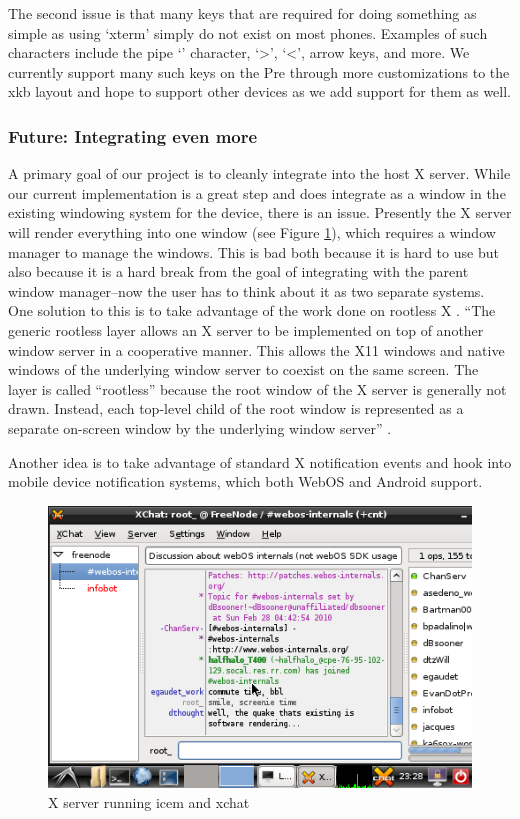 The second issue is that many keys that are required for doing something as simple as using `xterm' simply do not exist on most phones.  Examples of such characters include the pipe `\textbar' character, `\textgreater', `\textless', arrow keys, and more.  We currently support many such keys on the Pre through more customizations to the xkb layout and hope to support other devices as we add support for them as well. \\

\subsubsection{Future: Integrating even more}
A primary goal of our project is to cleanly integrate into the host X server.  While our current implementation is a great step and does integrate as a window in the existing windowing system for the device, there is an issue.  Presently the X server will render everything into one window (see Figure \ref{fig:x_screenie}), which requires a window manager to manage the windows.  This is bad both because it is hard to use but also because it is a hard break from the goal of integrating with the parent window manager--now the user has to think about it as two separate systems.\\

One solution to this is to take advantage of the work done on rootless X \cite{rootless}.  ``The generic rootless layer allows an X server to be implemented on top of another window server in a cooperative manner. This allows the X11 windows and native windows of the underlying window server to coexist on the same screen. The layer is called ``rootless'' because the root window of the X server is generally not drawn. Instead, each top-level child of the root window is represented as a separate on-screen window by the underlying window server'' \cite{rootless}.\\


Another idea is to take advantage of standard X notification events \cite{notifications} and hook into mobile device notification systems, which both WebOS and Android support. \\

\begin{figure}[tbh]
\centering
\includegraphics[width=1.0\columnwidth]{xchat1}
\caption{X server running icem and xchat}
\label{fig:x_screenie}
\end{figure}
